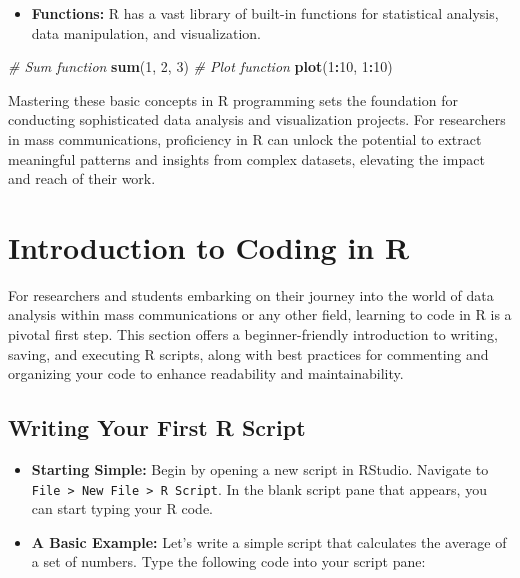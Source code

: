 \documentclass[
]{book}
\newenvironment{Shaded}{\begin{snugshade}}{\end{snugshade}}
\newcommand{\CommentTok}[1]{\textcolor[rgb]{0.56,0.35,0.01}{\textit{#1}}}
\newcommand{\DecValTok}[1]{\textcolor[rgb]{0.00,0.00,0.81}{#1}}
\newcommand{\FunctionTok}[1]{\textcolor[rgb]{0.13,0.29,0.53}{\textbf{#1}}}
\newcommand{\NormalTok}[1]{#1}
\newcommand{\SpecialCharTok}[1]{\textcolor[rgb]{0.81,0.36,0.00}{\textbf{#1}}}
\providecommand{\tightlist}{%
  \setlength{\itemsep}{0pt}\setlength{\parskip}{0pt}}
\begin{document}
\begin{itemize}
\tightlist
\item
  \textbf{Functions:} R has a vast library of built-in functions for statistical analysis, data manipulation, and visualization.
\end{itemize}

\begin{Shaded}
\begin{Highlighting}[]
\CommentTok{\# Sum function}
\FunctionTok{sum}\NormalTok{(}\DecValTok{1}\NormalTok{, }\DecValTok{2}\NormalTok{, }\DecValTok{3}\NormalTok{)}
\CommentTok{\# Plot function}
\FunctionTok{plot}\NormalTok{(}\DecValTok{1}\SpecialCharTok{:}\DecValTok{10}\NormalTok{, }\DecValTok{1}\SpecialCharTok{:}\DecValTok{10}\NormalTok{)}
\end{Highlighting}
\end{Shaded}

Mastering these basic concepts in R programming sets the foundation for conducting sophisticated data analysis and visualization projects. For researchers in mass communications, proficiency in R can unlock the potential to extract meaningful patterns and insights from complex datasets, elevating the impact and reach of their work.

\section{Introduction to Coding in R}\label{introduction-to-coding-in-r}

For researchers and students embarking on their journey into the world of data analysis within mass communications or any other field, learning to code in R is a pivotal first step. This section offers a beginner-friendly introduction to writing, saving, and executing R scripts, along with best practices for commenting and organizing your code to enhance readability and maintainability.

\subsection*{Writing Your First R Script}\label{writing-your-first-r-script}

\begin{itemize}
\item
  \textbf{Starting Simple:} Begin by opening a new script in RStudio. Navigate to \texttt{File\ \textgreater{}\ New\ File\ \textgreater{}\ R\ Script}. In the blank script pane that appears, you can start typing your R code.
\item
  \textbf{A Basic Example:} Let's write a simple script that calculates the average of a set of numbers. Type the following code into your script pane:
\end{itemize}
\end{document}
